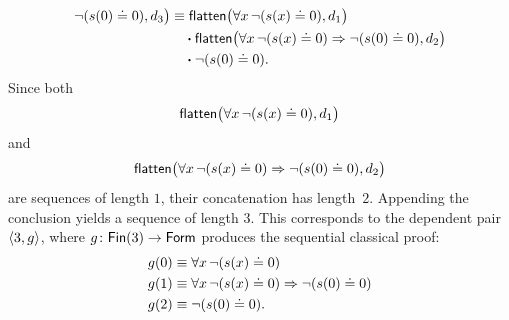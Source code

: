 \begin{xmpls}
\begin{description}[font=\normalfont\scshape]
\begin{align*}
                \neg(s(0)\doteq0),
                d_3
            \bigr)
                &\equiv
                    \mathsf{flatten}\bigl(
                        \forall x\,\neg(s(x)\doteq0),d_1
                    \bigr)\\
                &\quad
                    \mathbin{\boldsymbol{\cdot}}\mathsf{flatten}\bigl(
                        \forall x\,\neg(s(x)\doteq0)
                            \mathrel{\Rightarrow}
                            \neg(s(0)\doteq 0),
                        d_2
                    \bigr)\\
                &\quad
                    \mathbin{\boldsymbol{\cdot}}\neg(s(0)\doteq0).
        \end{align*}
        Since both
        \[
            \mathsf{flatten}\bigl(
                \forall x\,\neg(s(x)\doteq0),
                d_1
            \bigr)
        \]
        and
        \[
            \mathsf{flatten}
                \bigl(
                    \forall x\,\neg(s(x)\doteq0) 
                        \mathrel{\Rightarrow}\neg(s(0)\doteq0),
                    d_2
                \bigr)
        \]
        are sequences of length $1$, their concatenation has length~$2$. Appending the conclusion yields a sequence of length $3$. This corresponds to the dependent pair $\langle3,g\rangle$, where $g\colon\fun{Fin}(3)\to\fun{Form}$ produces the sequential classical proof:
        \begin{align*}
            g(0)&\equiv\forall x\,\neg(s(x)\doteq 0)\\
            g(1)&\equiv
                \forall x\,
                    \neg(s(x)\doteq 0)
                    \mathrel{\Rightarrow}
                    \neg(s(0)\doteq0)\\
            g(2)&\equiv\neg(s(0)\doteq 0).
        \end{align*}


\end{description}
\end{xmpls}
